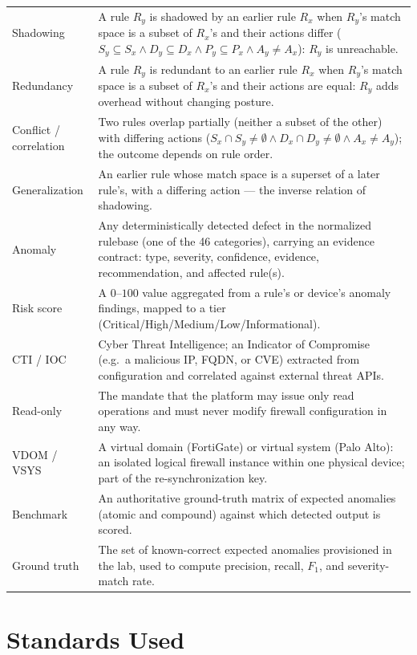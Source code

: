 \begin{longtable}{L{0.24\textwidth} L{0.70\textwidth}}
Shadowing & A rule $R_y$ is shadowed by an earlier rule $R_x$ when $R_y$'s match space is a subset of $R_x$'s and their actions differ ($S_y\subseteq S_x \wedge D_y\subseteq D_x \wedge P_y\subseteq P_x \wedge A_y\neq A_x$): $R_y$ is unreachable. \\
Redundancy & A rule $R_y$ is redundant to an earlier rule $R_x$ when $R_y$'s match space is a subset of $R_x$'s and their actions are equal: $R_y$ adds overhead without changing posture. \\
Conflict / correlation & Two rules overlap partially (neither a subset of the other) with differing actions ($S_x\cap S_y\neq\emptyset \wedge D_x\cap D_y\neq\emptyset \wedge A_x\neq A_y$); the outcome depends on rule order. \\
Generalization & An earlier rule whose match space is a superset of a later rule's, with a differing action --- the inverse relation of shadowing. \\
Anomaly & Any deterministically detected defect in the normalized rulebase (one of the 46 categories), carrying an evidence contract: type, severity, confidence, evidence, recommendation, and affected rule(s). \\
Risk score & A $0$--$100$ value aggregated from a rule's or device's anomaly findings, mapped to a tier (Critical/High/Medium/Low/Informational). \\
CTI / IOC & Cyber Threat Intelligence; an Indicator of Compromise (e.g.\ a malicious IP, FQDN, or CVE) extracted from configuration and correlated against external threat APIs. \\
Read-only & The mandate that the platform may issue only read operations and must never modify firewall configuration in any way. \\
VDOM / VSYS & A virtual domain (FortiGate) or virtual system (Palo Alto): an isolated logical firewall instance within one physical device; part of the re-synchronization key. \\
Benchmark & An authoritative ground-truth matrix of expected anomalies (atomic and compound) against which detected output is scored. \\
Ground truth & The set of known-correct expected anomalies provisioned in the lab, used to compute precision, recall, $F_1$, and severity-match rate. \\ \hline
\end{longtable}

\section{Standards Used}
\label{sec:ch1-standards}

